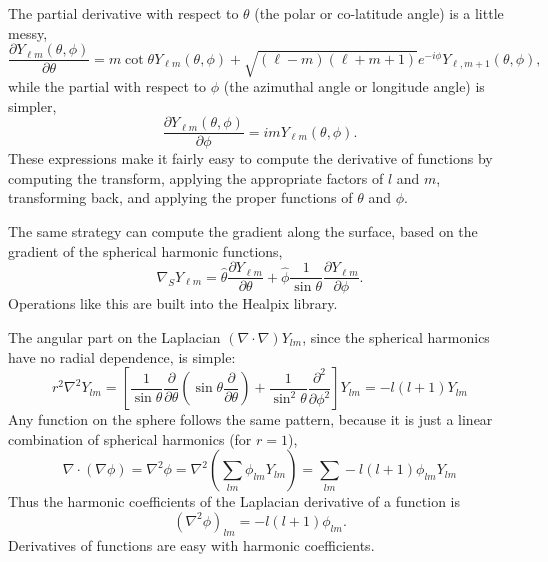 \begin{subappendices}
The partial derivative with respect to $\theta$ (the polar or co-latitude angle) is a little messy,
\begin{equation}
\frac{\partial Y_{\ell m}(\theta, \phi)}{\partial \theta} = m \cot \theta Y_{\ell m}(\theta, \phi) + \sqrt{(\ell-m)(\ell+m+1)} e^{-i\phi} Y_{\ell, m+1}(\theta, \phi),
\end{equation}
while the partial with respect to $\phi$ (the azimuthal angle or longitude angle) is simpler,
\begin{equation}
\frac{\partial Y_{\ell m}(\theta, \phi)}{\partial \phi} = im Y_{\ell m}(\theta, \phi).
\end{equation}
These expressions make it fairly easy to compute the derivative of functions by computing the transform, applying the appropriate factors of $l$ and $m$, transforming back, and applying the proper functions of $\theta$ and $\phi$.

The same strategy can compute the gradient along the surface, based on the gradient of the spherical harmonic functions,
\begin{equation}
\nabla_S Y_{\ell m} = \hat{\theta} \frac{\partial Y_{\ell m}}{\partial \theta} + \hat{\phi} \frac{1}{\sin \theta} \frac{\partial Y_{\ell m}}{\partial \phi}.
\end{equation}
Operations like this are built into the Healpix library.

The angular part on the Laplacian $(\nabla \cdot \nabla) Y_{lm}$, since the spherical harmonics have no radial dependence, is simple:
\begin{equation}
r^2 \nabla^2 Y_{l m} = \left[ \frac{1}{\sin \theta} \frac{\partial}{\partial \theta} \left( \sin \theta \frac{\partial}{\partial \theta} \right) + \frac{1}{\sin^2 \theta} \frac{\partial^2}{\partial \phi^2} \right] Y_{l m} = -l(l+1) Y_{l m}
\end{equation}
Any function on the sphere follows the same pattern, because it is just a linear combination of spherical harmonics (for $r=1$),
\begin{equation}
  \nabla \cdot (\nabla \phi) = \nabla^2 \phi =   \nabla^2 \left( \sum_{lm} \phi_{lm} Y_{l m} \right) =  \sum_{lm} -l(l+1) \phi_{lm}  Y_{l m}
\end{equation}
Thus the harmonic coefficients of the Laplacian derivative of a function is 
\begin{equation}
  \left( \nabla^2 \phi \right)_{lm} = -l(l+1) \phi_{lm}.
\end{equation}
Derivatives of functions are easy with harmonic coefficients.


\end{subappendices}
